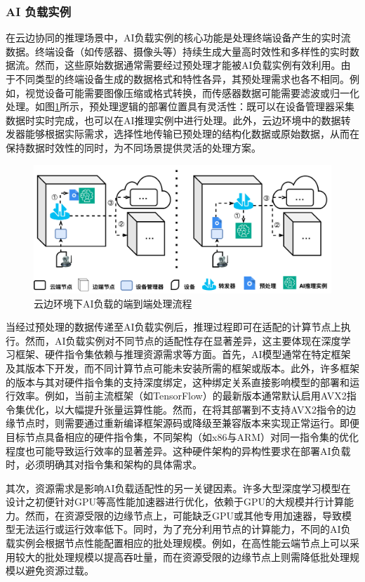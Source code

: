 \subsubsection{AI 负载实例}

在云边协同的推理场景中，AI负载实例的核心功能是处理终端设备产生的实时流数据。终端设备（如传感器、摄像头等）持续生成大量高时效性和多样性的实时数据流。然而，这些原始数据通常需要经过预处理才能被AI负载实例有效利用。由于不同类型的终端设备生成的数据格式和特性各异，其预处理需求也各不相同。例如，视觉设备可能需要图像压缩或格式转换，而传感器数据可能需要滤波或归一化处理。如图\ref{fig:3-4aiload}所示，预处理逻辑的部署位置具有灵活性：既可以在设备管理器采集数据时实时完成，也可以在AI推理实例中进行处理。此外，云边环境中的数据转发器能够根据实际需求，选择性地传输已预处理的结构化数据或原始数据，从而在保持数据时效性的同时，为不同场景提供灵活的处理方案。

\begin{figure}[h]
  \centering
  \includegraphics[width=0.9\linewidth]{pics/3-4AI负载.png}
  \caption{云边环境下AI负载的端到端处理流程}
  \label{fig:3-4aiload}
\end{figure}

当经过预处理的数据传递至AI负载实例后，推理过程即可在适配的计算节点上执行。然而，AI负载实例对不同节点的适配性存在显著差异，这主要体现在深度学习框架、硬件指令集依赖与推理资源需求等方面。首先，AI模型通常在特定框架及其版本下开发，而不同计算节点可能未安装所需的框架或版本。此外，许多框架的版本与其对硬件指令集的支持深度绑定，这种绑定关系直接影响模型的部署和运行效率。例如，当前主流框架（如TensorFlow）的最新版本通常默认启用AVX2指令集优化，以大幅提升张量运算性能。然而，在将其部署到不支持AVX2指令的边缘节点时，则需要通过重新编译框架源码或降级至兼容版本来实现正常运行。即便目标节点具备相应的硬件指令集，不同架构（如x86与ARM）对同一指令集的优化程度也可能导致运行效率的显著差异\cite{ren2019performance}。这种硬件架构的异构性要求在部署AI负载时，必须明确其对指令集和架构的具体需求。

其次，资源需求是影响AI负载适配性的另一关键因素。许多大型深度学习模型在设计之初便针对GPU等高性能加速器进行优化，依赖于GPU的大规模并行计算能力。然而，在资源受限的边缘节点上，可能缺乏GPU或其他专用加速器，导致模型无法运行或运行效率低下。同时，为了充分利用节点的计算能力，不同的AI负载实例会根据节点性能配置相应的批处理规模。例如，在高性能云端节点上可以采用较大的批处理规模以提高吞吐量，而在资源受限的边缘节点上则需降低批处理规模以避免资源过载。


